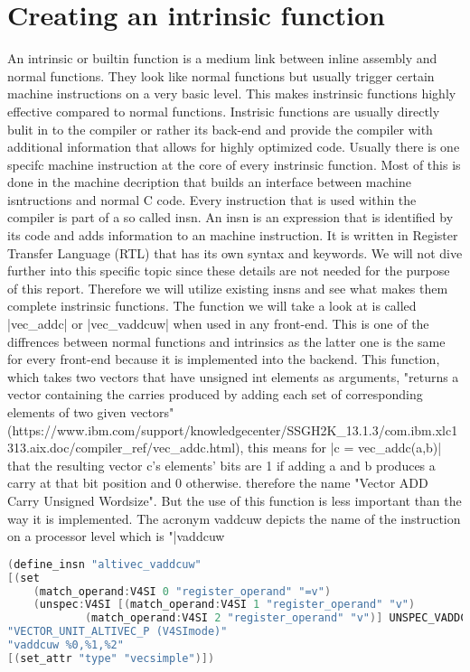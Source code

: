 \chapter{Creating an intrinsic function}
\label{chapter:builtins}

An intrinsic or builtin function is a medium link between inline assembly and normal functions. They look like normal functions but usually trigger certain machine instructions on a very basic level. This makes instrinsic functions highly effective compared to normal functions. Instrisic functions are usually directly bulit in to the compiler or rather its back-end and provide the compiler with additional information that allows for highly optimized code. Usually there is one specifc machine instruction at the core of every instrinsic function.
Most of this is done in the machine decription that builds an interface between machine isntructions and normal C code. Every instruction that is used within the compiler is part of a so called insn. An insn is an expression that is identified by its code and adds information to an machine instruction. It is written in Register Transfer Language (RTL) that has its own syntax and keywords.
We will not dive further into this specific topic since these details are not needed for the purpose of this report. Therefore we will utilize existing insns and see what makes them complete instrinsic functions.
The function we will take a look at is called |vec_addc| or |vec_vaddcuw| when used in any front-end. This is one of the diffrences between normal functions and intrinsics as the latter one is the same for every front-end because it is implemented into the backend.
This function, which takes two vectors that have unsigned int elements as arguments, "returns a vector containing the carries produced by adding each set of corresponding elements of two given vectors" (https://www.ibm.com/support/knowledgecenter/SSGH2K\_13.1.3/com.ibm.xlc1313.aix.doc/compiler\_ref/vec\_addc.html), this means for |c = vec_addc(a,b)| that the resulting vector c's elements' bits are 1 if adding a and b produces a carry at that bit position and 0 otherwise. therefore the name "Vector ADD Carry Unsigned Wordsize". But the use of this function is less important than the way it is implemented.
The acronym vaddcuw depicts the name of the instruction on a processor level which is "|vaddcuw  %
\begin{lstlisting}[language=C++,basicstyle=\ttfamily\scriptsize,keywordstyle=\color{red}]
(define_insn "altivec_vaddcuw"
[(set
	(match_operand:V4SI 0 "register_operand" "=v")
	(unspec:V4SI [(match_operand:V4SI 1 "register_operand" "v")
			(match_operand:V4SI 2 "register_operand" "v")] UNSPEC_VADDCUW))]
"VECTOR_UNIT_ALTIVEC_P (V4SImode)"
"vaddcuw %0,%1,%2"
[(set_attr "type" "vecsimple")])
\end{lstlisting}
